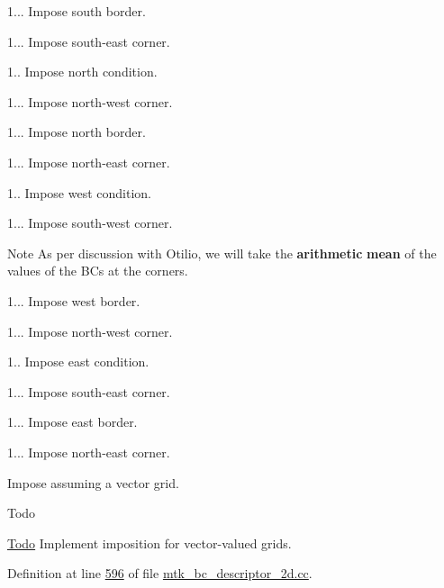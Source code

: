 1... Impose south border.

1... Impose south-\/east corner.

1.. Impose north condition.

1... Impose north-\/west corner.

1... Impose north border.

1... Impose north-\/east corner.

1.. Impose west condition.

1... Impose south-\/west corner. \begin{DoxyNote}{Note}
As per discussion with Otilio, we will take the {\bfseries arithmetic} {\bfseries mean} of the values of the B\+Cs at the corners.
\end{DoxyNote}
1... Impose west border.

1... Impose north-\/west corner.

1.. Impose east condition.

1... Impose south-\/east corner.

1... Impose east border.

1... Impose north-\/east corner.


\begin{DoxyEnumerate}
\item Impose assuming a vector grid.
\end{DoxyEnumerate}

\begin{DoxyRefDesc}{Todo}
\item[\hyperlink{todo__todo000014}{Todo}]Implement imposition for vector-\/valued grids. \end{DoxyRefDesc}


Definition at line \hyperlink{mtk__bc__descriptor__2d_8cc_source_l00596}{596} of file \hyperlink{mtk__bc__descriptor__2d_8cc_source}{mtk\+\_\+bc\+\_\+descriptor\+\_\+2d.\+cc}.



